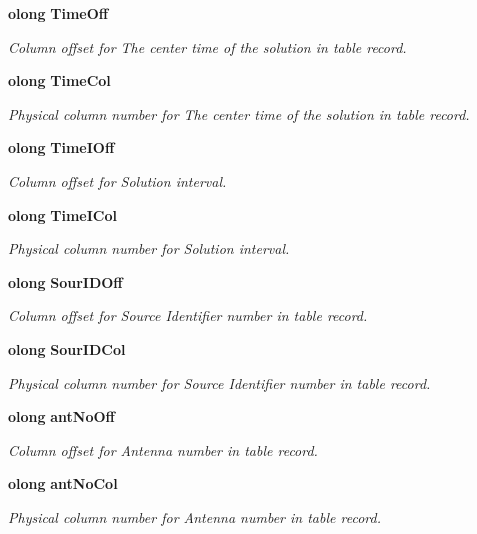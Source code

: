 \begin{CompactItemize}
{\bf olong} {\bf Time\-Off}
\begin{CompactList}\small\item\em Column offset for The center time of the solution in table record. \item\end{CompactList}\item 
{\bf olong} {\bf Time\-Col}
\begin{CompactList}\small\item\em Physical column number for The center time of the solution in table record. \item\end{CompactList}\item 
{\bf olong} {\bf Time\-IOff}
\begin{CompactList}\small\item\em Column offset for Solution interval. \item\end{CompactList}\item 
{\bf olong} {\bf Time\-ICol}
\begin{CompactList}\small\item\em Physical column number for Solution interval. \item\end{CompactList}\item 
{\bf olong} {\bf Sour\-IDOff}
\begin{CompactList}\small\item\em Column offset for Source Identifier number in table record. \item\end{CompactList}\item 
{\bf olong} {\bf Sour\-IDCol}
\begin{CompactList}\small\item\em Physical column number for Source Identifier number in table record. \item\end{CompactList}\item 
{\bf olong} {\bf ant\-No\-Off}
\begin{CompactList}\small\item\em Column offset for Antenna number in table record. \item\end{CompactList}\item 
{\bf olong} {\bf ant\-No\-Col}
\begin{CompactList}\small\item\em Physical column number for Antenna number in table record. \item\end{CompactList}\item 

\end{CompactItemize}
